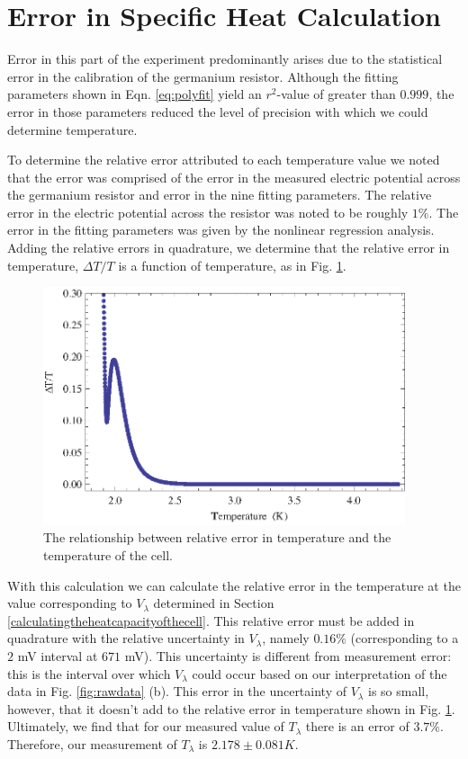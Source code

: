 
\section{Error in Specific Heat Calculation}\label{errorinspecificheatcalculation}

Error in this part of the experiment predominantly arises due to the statistical error in the calibration of the germanium resistor.  Although the fitting parameters shown in Eqn. \ref{eq:polyfit} yield an $r^{2}$-value of greater than $0.999$, the error in those parameters reduced the level of precision with which we could determine temperature.  

To determine the relative error attributed to each temperature value we noted that the error was comprised of the error in the measured electric potential across the germanium resistor and error in the nine fitting parameters.  The relative error in the electric potential across the resistor was noted to be roughly $1\%$.  The error in the fitting parameters was given by the nonlinear regression analysis.  Adding the relative errors in quadrature, we determine that the relative error in temperature, $\Delta T/T$ is a function of temperature, as in Fig. \ref{fig:temperror}.  

\begin{figure}[htbp]
\begin{center}
\includegraphics[height=70mm]{./figures/temperror.eps}
\caption{\small{The relationship between relative error in temperature and the temperature of the cell.}}
\label{fig:temperror}
\end{center}
\end{figure}

With this calculation we can calculate the relative error in the temperature at the value corresponding to $V_{\lambda}$ determined in Section \ref{calculatingtheheatcapacityofthecell}.  This relative error must be added in quadrature with the relative uncertainty in $V_{\lambda}$, namely $0.16\%$ (corresponding to a $2$ mV interval at $671$ mV).  This uncertainty is different from measurement error: this is the interval over which $V_{\lambda}$ could occur based on our interpretation of the data in Fig. \ref{fig:rawdata} (b).  This error in the uncertainty of $V_{\lambda}$ is so small, however, that it doesn't add to the relative error in temperature shown in Fig. \ref{fig:temperror}.  Ultimately, we find that for our measured value of $T_{\lambda}$ there is an error of $3.7\%$.  Therefore, our measurement of $T_{\lambda}$ is $2.178\pm0.081 K$.

